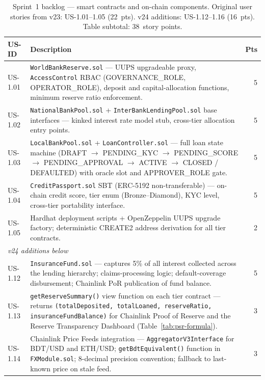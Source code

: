 \begin{table}[H]
\centering
\caption{Sprint~1 backlog --- smart contracts and on-chain components.
Original user stories from v23: US-1.01--1.05 (22~pts). v24 additions:
US-1.12--1.16 (16~pts). Table subtotal: 38~story points.}
\label{tab:sprint1-contracts}
\small
\begin{tabular}{p{1.3cm}p{10.2cm}r}
\hline
\textbf{US-ID} & \textbf{Description} & \textbf{Pts} \\
\hline
US-1.01 & \texttt{WorldBankReserve.sol} --- UUPS upgradeable proxy,
  \texttt{AccessControl} RBAC (GOVERNANCE\_ROLE, OPERATOR\_ROLE),
  deposit and capital-allocation functions, minimum reserve ratio
  enforcement. & 5 \\
US-1.02 & \texttt{NationalBankPool.sol} + \texttt{InterBankLendingPool.sol}
  base interfaces --- kinked interest rate model stub, cross-tier
  allocation entry points. & 5 \\
US-1.03 & \texttt{LocalBankPool.sol} + \texttt{LoanController.sol} ---
  full loan state machine (DRAFT $\to$ PENDING\_KYC $\to$ PENDING\_SCORE
  $\to$ PENDING\_APPROVAL $\to$ ACTIVE $\to$ CLOSED / DEFAULTED) with
  oracle slot and APPROVER\_ROLE gate. & 5 \\
US-1.04 & \texttt{CreditPassport.sol} SBT (ERC-5192 non-transferable) ---
  on-chain credit score, tier enum (Bronze--Diamond), KYC level, cross-tier
  portability interface. & 5 \\
US-1.05 & Hardhat deployment scripts + OpenZeppelin UUPS upgrade factory;
  deterministic CREATE2 address derivation for all tier contracts. & 2 \\
\hline
\multicolumn{2}{l}{\textit{v24 additions below}} & \\
\hline
US-1.12 & \texttt{InsuranceFund.sol} --- captures 5\% of all interest
  collected across the lending hierarchy; claims-processing logic;
  default-coverage disbursement; Chainlink PoR publication of fund
  balance. & 5 \\
US-1.13 & \texttt{getReserveSummary()} view function on each tier contract ---
  returns \texttt{(totalDeposited, totalLoaned, reserveRatio, insuranceFundBalance)}
  for Chainlink Proof of Reserve and the Reserve Transparency Dashboard
  (Table~\ref{tab:psr-formula}). & 3 \\
US-1.14 & Chainlink Price Feeds integration --- \texttt{AggregatorV3Interface}
  for BDT/USD and ETH/USD; \texttt{getBdtEquivalent()} function in
  \texttt{FXModule.sol}; 8-decimal precision convention; fallback to
  last-known price on stale feed. & 3 \\

\end{tabular}
\end{table}
